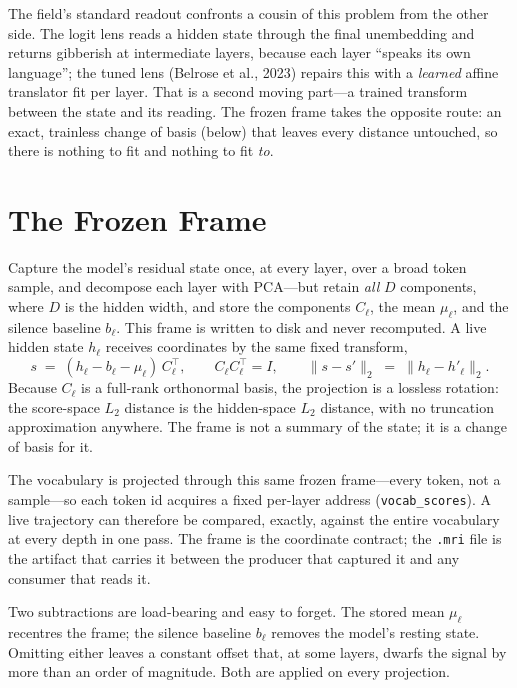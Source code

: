 \documentclass[11pt,a4paper]{article}
\newcommand{\mri}{\texttt{.mri}}
\begin{document}
The field's standard readout confronts a cousin of this problem from the other
side. The logit lens reads a hidden state through the final unembedding and
returns gibberish at intermediate layers, because each layer ``speaks its own
language''; the tuned lens (Belrose et al., 2023) repairs this with a
\emph{learned} affine translator fit per layer. That is a second moving part---a
trained transform between the state and its reading. The frozen frame takes the
opposite route: an exact, trainless change of basis (below) that leaves every
distance untouched, so there is nothing to fit and nothing to fit \emph{to}.

\section{The Frozen Frame}

Capture the model's residual state once, at every layer, over a broad token sample,
and decompose each layer with PCA---but retain \emph{all} $D$ components, where $D$ is
the hidden width, and store the components $C_\ell$, the mean $\mu_\ell$, and the
silence baseline $b_\ell$. This frame is written to disk and never recomputed. A live
hidden state $h_\ell$ receives coordinates by the same fixed transform,
%
\[
s \;=\; (h_\ell - b_\ell - \mu_\ell)\,C_\ell^{\!\top},
\qquad C_\ell C_\ell^{\!\top} = I,
\qquad \lVert s - s' \rVert_2 \;=\; \lVert h_\ell - h'_\ell \rVert_2 .
\]
%
Because $C_\ell$ is a full-rank orthonormal basis, the projection is a lossless
rotation: the score-space $L_2$ distance is the hidden-space $L_2$ distance, with no
truncation approximation anywhere. The frame is not a summary of the state; it is a
change of basis for it.

The vocabulary is projected through this same frozen frame---every token, not a
sample---so each token id acquires a fixed per-layer address (\texttt{vocab\_scores}).
A live trajectory can therefore be compared, exactly, against the entire vocabulary at
every depth in one pass. The frame is the coordinate contract; the \mri{} file is the
artifact that carries it between the producer that captured it and any consumer that
reads it.

Two subtractions are load-bearing and easy to forget. The stored mean $\mu_\ell$
recentres the frame; the silence baseline $b_\ell$ removes the model's resting state.
Omitting either leaves a constant offset that, at some layers, dwarfs the signal by
more than an order of magnitude. Both are applied on every projection.
\end{document}
